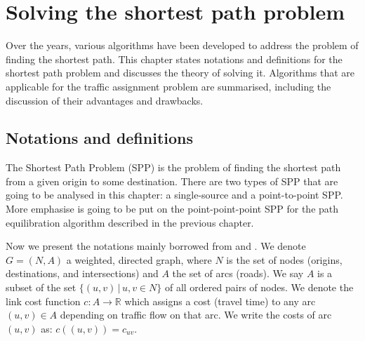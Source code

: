 \chapter{Solving the shortest path problem}
\label{chap:solvingspp}

Over the years,
various algorithms have been developed 
to address the problem of finding the shortest path.
This chapter states notations and definitions for the shortest path problem and discusses
the theory of solving it.
Algorithms that are applicable for the traffic assignment problem are summarised,
including the discussion of their advantages and drawbacks.

\section{Notations and definitions}
The Shortest Path Problem (SPP) is the problem of finding the shortest path from a given origin  to some destination.
There are two types of SPP that are going to
be analysed in this chapter:
a single-source and a point-to-point SPP.  
More emphasise is going to be put on the point-point-point SPP for the path equilibration algorithm described in the previous chapter.


Now we present the notations mainly borrowed from \citet{Cormen} and \citet{Klunder}.
We denote $ G = ( N, A ) $ a weighted, directed graph,
where $ N $ is the set of nodes (origins, destinations, and intersections)
and $ A $ the set of arcs (roads).
We say $ A $ is a subset of the set $ \{ (u, v)\, | \, u, v \in N \} $ of all ordered pairs of nodes.
We denote the link cost function $ c : A \rightarrow \mathbb{R} $ which assigns a cost (travel time) to any arc $ (u,v) \in A $ depending on traffic flow on that arc.
We write the costs of arc $(u, v)$ as: $ c((u, v)) = c_{uv} $.


